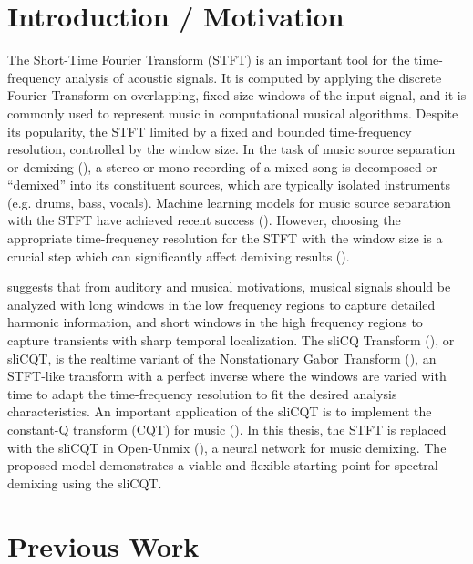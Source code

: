 \documentclass[letter,12pt]{article}
\title{\ThesisTitle}
\author{Sevag Hanssian, sevag.hanssian@mail.mcgill.ca}
\begin{document}
\maketitle

\section{Introduction / Motivation}


The Short-Time Fourier Transform (STFT) is an important tool for the time-frequency analysis of acoustic signals. It is computed by applying the discrete Fourier Transform on overlapping, fixed-size windows of the input signal, and it is commonly used to represent music in computational musical algorithms. Despite its popularity, the STFT limited by a fixed and bounded time-frequency resolution, controlled by the window size. In the task of music source separation or demixing (\cite{musicsepgood}), a stereo or mono recording of a mixed song is decomposed or ``demixed'' into its constituent sources, which are typically isolated instruments (e.g. drums, bass, vocals). Machine learning models for music source separation with the STFT have achieved recent success (\cite{sisec2018}). However, choosing the appropriate time-frequency resolution for the STFT with the window size is a crucial step which can significantly affect demixing results (\cite{tftradeoff1}).

 \textcite{doerflerphd} suggests that from auditory and musical motivations, musical signals should be analyzed with long windows in the low frequency regions to capture detailed harmonic information, and short windows in the high frequency regions to capture transients with sharp temporal localization. The sliCQ Transform (\cite{invertiblecqt}), or sliCQT, is the realtime variant of the Nonstationary Gabor Transform (\cite{balazs}), an STFT-like transform with a perfect inverse where the windows are varied with time to adapt the time-frequency resolution to fit the desired analysis characteristics. An important application of the sliCQT is to implement the constant-Q transform (CQT) for music (\cite{jbrown}). In this thesis, the STFT is replaced with the sliCQT in Open-Unmix (\cite{umx}), a neural network for music demixing. The proposed model demonstrates a viable and flexible starting point for spectral demixing using the sliCQT.

\section{Previous Work}
\end{document}
